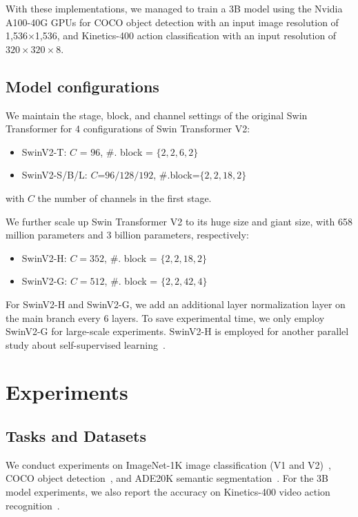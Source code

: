\documentclass[10pt,twocolumn,letterpaper]{article}
\begin{document}
With these implementations, we managed to train a 3B model using the Nvidia A100-40G GPUs for COCO object detection with an input image resolution of 1,536$\times$1,536, and Kinetics-400 action classification with an input resolution of $320\times 320 \times 8$.



\subsection{Model configurations}

We maintain the stage, block, and channel settings of the original Swin Transformer for 4 configurations of Swin Transformer V2:
\begin{itemize}
    \item SwinV2-T: $C$ = $96$, \#. block = $\{2, 2, 6, 2\}$
    \item SwinV2-S/B/L: $C$=$96/128/192$, \#.block=$\{2, 2, 18, 2\}$
\end{itemize}
with $C$ the number of channels in the first stage. 

We further scale up Swin Transformer V2 to its huge size and giant size, with 658 million parameters and 3 billion parameters, respectively:
\begin{itemize}
    \item SwinV2-H: $C=352$, \#. block = $\{2, 2, 18, 2\}$
    \item SwinV2-G: $C=512$, \#. block = $\{2, 2, 42, 4\}$
\end{itemize}
For SwinV2-H and SwinV2-G, we add an additional layer normalization layer on the main branch every 6 layers. To save experimental time, we only employ SwinV2-G for large-scale experiments. %
SwinV2-H is employed for another parallel study about self-supervised learning~\cite{simmim}.

\section{Experiments}

\subsection{Tasks and Datasets}


We conduct experiments on ImageNet-1K image classification (V1 and V2)~\cite{deng2009imagenet,recht2019imagenet}, COCO object detection~\cite{lin2014coco}, and ADE20K semantic segmentation~\cite{zhou2018semantic}. For the 3B model experiments, we also report the accuracy on Kinetics-400 video action recognition~\cite{kay2017kinetics}.
\end{document}

